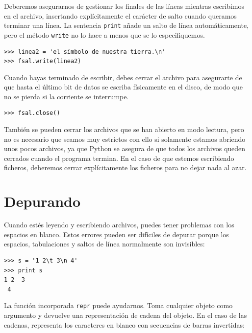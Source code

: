 Deberemos asegurarnos de gestionar los finales de las líneas mientras
escribimos en el archivo, insertando explícitamente el carácter de salto
cuando queramos terminar una línea. La sentencia {\tt print}
añade un salto de línea automáticamente, pero el método
{\tt write} no lo hace a menos que se lo especifiquemos.

\beforeverb
\begin{verbatim}
>>> linea2 = 'el símbolo de nuestra tierra.\n'
>>> fsal.write(linea2)
\end{verbatim}
\afterverb
%
Cuando hayas terminado de escribir, debes cerrar el archivo
para asegurarte de que hasta el último bit de datos se escriba
físicamente en el disco, de modo que no se pierda si la corriente se interrumpe.

\beforeverb
\begin{verbatim}
>>> fsal.close()
\end{verbatim}
\afterverb
%
También se pueden cerrar los archivos que se han abierto en modo lectura,
pero no es necesario que seamos muy estrictos con ello si solamente
estamos abriendo unos pocos archivos, ya que Python se asegura de que
todos los archivos queden cerrados cuando el programa termina. En el caso
de que estemos escribiendo ficheros, deberemos cerrar explícitamente los ficheros
para no dejar nada al azar.



\section{Depurando}


Cuando estés leyendo y escribiendo archivos, puedes tener problemas
con los espacios en blanco. Estos errores pueden ser difíciles de depurar porque los espacios,
tabulaciones y saltos de línea normalmente son invisibles:

\beforeverb
\begin{verbatim}
>>> s = '1 2\t 3\n 4'
>>> print s
1 2	 3
 4
\end{verbatim}
\afterverb


La función incorporada {\tt repr} puede ayudarnos. Toma cualquier objeto como
argumento y devuelve una representación de cadena del objeto. En el caso
de las cadenas, representa los caracteres en blanco
con secuencias de barras invertidas:

